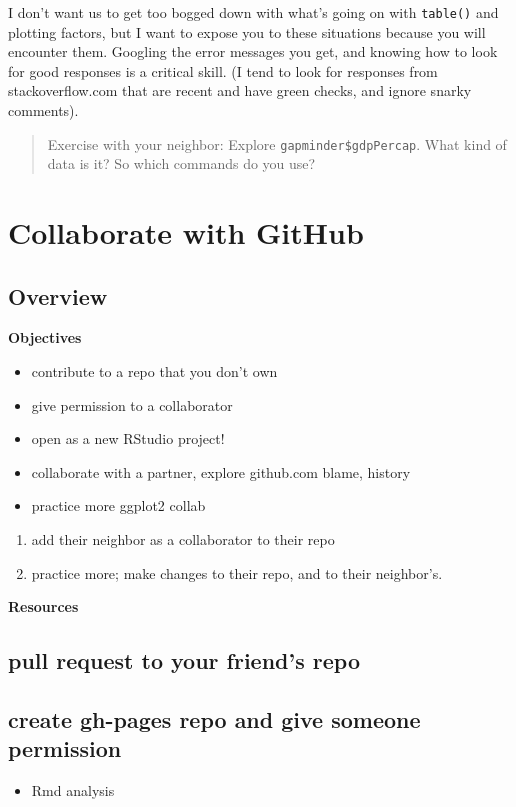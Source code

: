 \documentclass[]{book}
\providecommand{\tightlist}{%
  \setlength{\itemsep}{0pt}\setlength{\parskip}{0pt}}
\theoremstyle{definition}
\theoremstyle{definition}
\theoremstyle{definition}
\theoremstyle{remark}
\begin{document}
I don't want us to get too bogged down with what's going on with
\texttt{table()} and plotting factors, but I want to expose you to these
situations because you will encounter them. Googling the error messages
you get, and knowing how to look for good responses is a critical skill.
(I tend to look for responses from stackoverflow.com that are recent and
have green checks, and ignore snarky comments).

\begin{quote}
Exercise with your neighbor: Explore \texttt{gapminder\$gdpPercap}. What
kind of data is it? So which commands do you use?
\end{quote}

\chapter{Collaborate with GitHub}\label{collaborate}

\section{Overview}\label{overview-2}

\textbf{Objectives}

\begin{itemize}
\tightlist
\item
  contribute to a repo that you don't own
\item
  give permission to a collaborator
\item
  open as a new RStudio project!
\item
  collaborate with a partner, explore github.com blame, history
\item
  practice more ggplot2 collab
\end{itemize}

\begin{enumerate}
\def\labelenumi{\arabic{enumi}.}
\tightlist
\item
  add their neighbor as a collaborator to their repo
\item
  practice more; make changes to their repo, and to their neighbor's.
\end{enumerate}

\textbf{Resources}

\section{pull request to your friend's
repo}\label{pull-request-to-your-friends-repo}

\section{create gh-pages repo and give someone
permission}\label{create-gh-pages-repo-and-give-someone-permission}

\begin{itemize}
\tightlist
\item
  Rmd analysis
\end{itemize}
\end{document}
